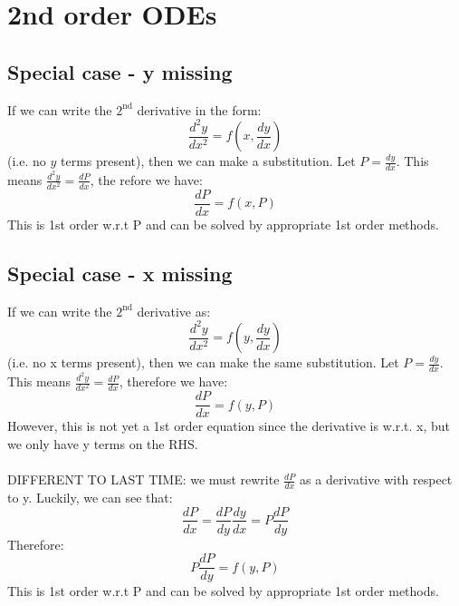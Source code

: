 \documentclass{scrartcl}
\begin{document}
\section{2nd order ODEs}

\subsection{Special case - y missing}
If we can write the $ 2^{\textrm{nd}} $ derivative in the form:
\begin{equation}
\frac{d^{2}y}{dx^{2}} = f(x, \frac{dy}{dx})
\end{equation}
(i.e. no $ y $ terms present), then we can make a substitution. Let $ P = \frac{dy}{dx} $. This means $ \frac{d^{2}y}{dx^{2}} = \frac{dP}{dx} $, the
refore we have:
\begin{equation}
\frac{dP}{dx} = f(x, P)
\end{equation}
This is 1st order w.r.t P and can be solved by appropriate 1st order methods.

\subsection{Special case - x missing}
If we can write the $ 2^{\textrm{nd}} $ derivative as:
\begin{equation}
\frac{d^{2}y}{dx^{2}} = f(y, \frac{dy}{dx})
\end{equation}
(i.e. no x terms present), then we can make the same substitution. Let $ P = \frac{dy}{dx} $. This means $ \frac{d^{2}y}{dx^{2}} = \frac{dP}{dx} $, therefore we have:
\begin{equation}
\frac{dP}{dx} = f(y, P)
\end{equation}
However, this is not yet a 1st order equation since the derivative is w.r.t. x, but we only have y terms on the RHS.
\\\\
DIFFERENT TO LAST TIME: we must rewrite $ \frac{dP}{dx} $ as a derivative with respect to y. Luckily, we can see that:
\begin{equation}
\frac{dP}{dx} = \frac{dP}{dy}\frac{dy}{dx} = P\frac{dP}{dy}
\end{equation}
Therefore:
\begin{equation}
P\frac{dP}{dy} = f(y, P)
\end{equation}
This is 1st order w.r.t P and can be solved by appropriate 1st order methods.
\end{document}
